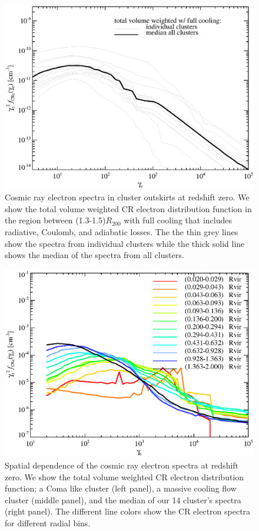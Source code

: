 \documentclass[useAMS,usenatbib]{mn2e}
\newcommand{\rvir}{R_{200}}
\begin{document}
\begin{figure}
  \includegraphics[width=1.0\columnwidth]{./figures/CRespec.all.1.4Rv.a24.full.020.v20.eps}
  \caption{Cosmic ray electron spectra in cluster outskirts at
    redshift zero. We show the total volume weighted CR electron
    distribution function in the region between (1.3-1.5)$\rvir$ with
    full cooling that includes radiative, Coulomb, and adiabatic
    losses. The the thin grey lines show the spectra from individual
    clusters while the thick solid line shows the median of the
    spectra from all clusters. \label{fig:e_spec_all}}
\end{figure}

\begin{figure}
  \includegraphics[width=1.0\columnwidth]{./figures/old/CRespecRadial.Radial2Rv.a24.140.v16.eps}
  \caption{Spatial dependence of the cosmic ray electron spectra at
    redshift zero. We show the total volume weighted CR electron
    distribution function; a Coma like cluster (left panel), a massive
    cooling flow cluster (middle panel), and the median of our 14
    cluster's spectra (right panel). The different line colors show
    the CR electron spectra for different radial
    bins.\label{fig:e_spec_spatial}}
\end{figure}
\end{document}
